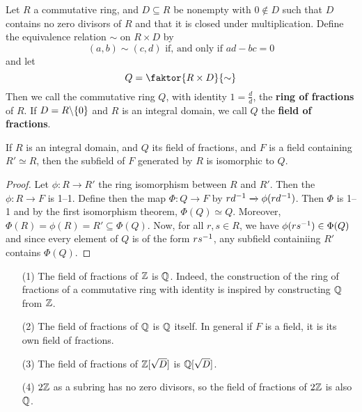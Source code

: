 \begin{definition}
    Let $R$ a commutative ring, and  $D \subseteq R$ be nonempty with $0 \notin
    D$ such that $D$ contains no zero divisors of $R$ and that it is closed
    under multiplication. Define the equivalence relation $\sim$ on  $R \times D$
    by
    \begin{equation*}
        (a,b) \sim (c,d) \text{ if, and only if } ad-bc=0
    \end{equation*}
    and let
    \begin{equation*}
        Q=\faktor{R \times D}{\sim}
    \end{equation*}
    Then we call the commutative ring $Q$, with identity  $1=\frac{d}{d}$, the
    \textbf{ring of fractions} of $R$. If $D=R \backslash \{0\}$ and $R$ is an
    integral domain, we call  $Q$ the \textbf{field of fractions}.
\end{definition}

\begin{lemma}\label{1.5.3}
    If $R$ is an integral domain, and  $Q$ its field of fractions, and  $F$ is a
    field containing  $R' \simeq R$, then the subfield of $F$ generated by $R$
    is isomorphic to $Q$.
\end{lemma}
\begin{proof}
    Let $\phi:R \xrightarrow{} R'$ the ring isomorphism between $R$ and  $R'$.
    Then the  $\phi:R \xrightarrow{} F$ is 1--1. Define then the map $\Phi:Q
    \xrightarrow{} F$ by $rd^{-1} \xrightarrow{} \phi(rd^{-1})$. Then $\Phi$
    is 1--1 and by the first isomorphism theorem, $\Phi(Q) \simeq Q$. Moreover,
    $\Phi(R)=\phi(R)=R' \subseteq \Phi(Q)$. Now, for all $r,s \in R$, we have
    $\phi(rs^{-1}) \in \Phi(Q)$ and since every element of $Q$ is of the form
    $rs^{-1}$, any subfield containiing $R'$ contains  $\Phi(Q)$.
\end{proof}

\begin{example}\label{1.18}
    \begin{enumerate}
        \item[(1)] The field of fractions of $\mathbb{Z}$ is $\mathbb{Q}$. Indeed, the
            construction of the ring of fractions of a commutative ring with
            identity is inspired by constructing $\mathbb{Q}$ from $\mathbb{Z}$.

        \item[(2)] The field of fractions of $\mathbb{Q}$ is $\mathbb{Q}$ itself. In general if
            $F$ is a field, it is its own field of fractions.

        \item [(3)] The field of fractions of $\mathbb{Z}[\sqrt{D}]$ is $\mathbb{Q}[\sqrt{D}]$.

        \item[(4)] $2\mathbb{Z}$ as a subring has no zero divisors, so the field of
            fractions of $2\mathbb{Z}$ is also $\mathbb{Q}$.
    \end{enumerate}
\end{example}
